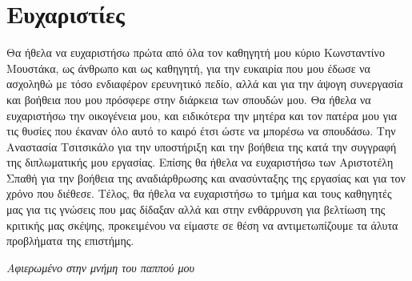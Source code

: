 \section*{Ευχαριστίες}

Θα ήθελα να ευχαριστήσω πρώτα από όλα τον καθηγητή μου κύριο Κωνσταντίνο Μουστάκα, ως άνθρωπο και ως καθηγητή, για την ευκαιρία που μου έδωσε να ασχοληθώ με τόσο ενδιαφέρον ερευνητικό πεδίο, αλλά και για την άψογη συνεργασία και βοήθεια που μου πρόσφερε στην διάρκεια των σπουδών μου. Θα ήθελα να ευχαριστήσω την οικογένεια μου, και ειδικότερα την μητέρα και τον πατέρα μου για τις θυσίες που έκαναν όλο αυτό το καιρό έτσι ώστε να μπορέσω να σπουδάσω. Την Αναστασία Τσιτσικάλο για την υποστήριξη και την βοήθεια της κατά την συγγραφή της διπλωματικής μου εργασίας. Επίσης θα ήθελα να ευχαριστήσω των Αριστοτέλη Σπαθή για την βοήθεια της αναδιάρθρωσης και ανασύνταξης της εργασίας και για τον χρόνο που διέθεσε. Τέλος, θα ήθελα να ευχαριστήσω το τμήμα και τους καθηγητές μας για τις γνώσεις που μας δίδαξαν αλλά και στην ενθάρρυνση για βελτίωση της κριτικής μας σκέψης, προκειμένου να είμαστε σε θέση να αντιμετωπίζουμε τα άλυτα προβλήματα της επιστήμης.

\thispagestyle{empty}
\clearpage

\begin{center}
  \null\vfill
  \large{{\em Αφιερωμένο στην μνήμη του παππού μου}}
  \vspace{2cm}
  \null\vfill
\end{center}

\thispagestyle{empty} 